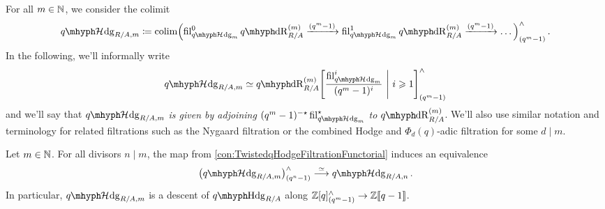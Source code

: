 \documentclass[DIV=12,numbers=enddot,leqno,bibliography=totoc]{scrartcl}
\begin{document}
	\begin{numpar}\label{con:HabiroDescent0}
		For all $m\in\mathbb{N}$, we consider the colimit
		\begin{equation*}
			\qHhodge_{R/A,m}\coloneqq \colimit\Bigl( \fil_{\qHhodge_m}^{0}\qdeRham_{R/A}^{(m)}\xrightarrow{(q^m-1)} \fil_{\qHhodge_m}^{1}\qdeRham_{R/A}^{(m)}\xrightarrow{(q^m-1)}\dotso\Bigr)_{(q^m-1)}^\complete\,.
		\end{equation*}
		In the following, we'll informally write
		\begin{equation*}
			\qHhodge_{R/A,  m}\simeq \qdeRham_{R/A}^{(m)}\left[\frac{ \fil_{\qHhodge_m}^i}{(q^m-1)^i}\ \middle|\ i\geqslant 1\right]_{(q^m-1)}^\complete
		\end{equation*}
		and we'll say that \emph{$\qHhodge_{R/A,  m}$ is given by adjoining $(q^m-1)^{-\star} \fil_{\qHhodge_m}^\star$ to $\qdeRham_{R/A}^{(m)}$}. We'll also use similar notation and terminology for related filtrations such as the Nygaard filtration or the combined Hodge and $\Phi_d(q)$-adic filtration for some $d\mid m$.
	\end{numpar}
	\begin{prop}\label{prop:HabiroDescent}
		Let $m\in\mathbb{N}$. For all divisors $n\mid m$, the map from \cref{con:TwistedqHodgeFiltrationFunctorial} induces an equivalence
		\begin{equation*}
			\bigl(\qHhodge_{R/A,  m}\bigr)_{(q^n-1)}^\complete\overset{\simeq}{\longrightarrow}\qHhodge_{R/A,  n}\,. 
		\end{equation*}
		In particular, $\qHhodge_{R/A,  m}$ is a descent of $\qHodge_{R/A}$ along $\mathbb{Z}[q]_{(q^m-1)}^\wedge\rightarrow \mathbb{Z}\llbracket q-1\rrbracket$.
	\end{prop}
\end{document}
